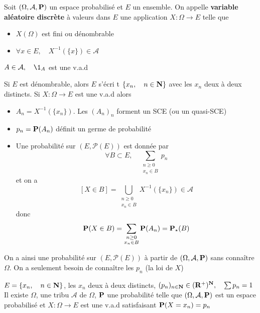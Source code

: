 \begin{dfn}
    Soit $(\Omega, \mathcal A, \P)$ un espace probabilisé et $E$ un ensemble. On appelle \textbf{variable aléatoire discrète} à valeurs dans $E$ une application $X:\Omega \to  E$ telle que \begin{itemize}
        \item $X(\Omega)$ est fini ou dénombrable
        \item  $ \forall x \in  E,\quad X^{-1}(\{x\} )\in  \mathcal A$
    \end{itemize}
\end{dfn}

\begin{ex}
    $A\in \mathcal A,\quad \1_A$ est une v.a.d
\end{ex}

\begin{rem}
    Si $E$ est dénombrable, alors $E$ s'écri t  $\{x_n,\quad n\in \N\} $ avec les $x_n$ deux à deux distincts. Si  $X:\Omega \to  E$ est une v.a.d alors \begin{itemize}
        \item $A_n=X^{-1}(\{x_n\} )$. Les $(A_n)_n$ forment un SCE (ou un quasi-SCE)
        \item $p_n=\P(A_n)$ définit un germe de probabilité
        \item Une probabilité sur $(E, \mathcal P(E))$ est donnée par \[
                \forall B\subset E,\quad \sum_{\substack{n\geq 0\\ x_n\in  B}}p_n
        \] 
        et on a \[
            [X\in B]=\bigcup_{\substack{n\geq 0\\x_n\in  B}}X^{-1}(\{x_n\} )\in  \mathcal A 
        \] 
        donc \[
            \P(X\in  B)=\sum_{\substack{n\geq 0\\x_n\in B}}\P(A_n)=\P_\star (B)
        \] 
    \end{itemize}
    On a ainsi une probabilité sur $(E, \mathcal P(E))$ à partir de $(\Omega, \mathcal A, \P)$ sans connaître $\Omega$. On a seulement besoin de connaître les $p_n$ (la loi de $X$)
\end{rem}

\begin{thm}
    \Hyp $E=\{x_n, \quad n\in \N\} $, les $x_n$ deux à deux distincts, $(p_n)_{n\in \N}\in (\R^+)^{\N}, \quad \sum p_n=1$
    \Conc Il existe $\Omega$, une tribu $\mathcal A$ de $\Omega$, $\P$ une probabilité telle que $(\Omega, \mathcal A,\P)$ est un espace probabilisé et $X:\Omega\to E$ est une v.a.d satisfaisant $\P(X=x_n)=p_n$
\end{thm}

